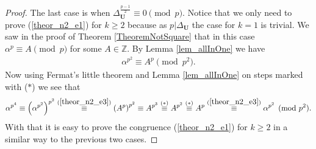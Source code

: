 \documentclass[preprint,12pt]{elsarticle}
\newcommand{\N}{\mathbb{N}}
\newcommand{\Z}{\mathbb{Z}}
\newcommand{\F}{\mathbb{F}}
\begin{document}
\begin{proof}
 The last case is when $\Delta_\mathbf{U}^\frac{p-1}{2} \equiv 0 \pmod p$. Notice that we only need to prove (\ref{theor_n2_e1}) for $k\geqslant 2$ because as $p|\Delta_\mathbf{U}$ the case for $k=1$ is trivial.  We saw in the proof of Theorem \ref{TheoremNotSquare} that in this case $\alpha^p \equiv A \pmod p$ for some $A \in \Z$. By Lemma \ref{lem_allInOne} we have
 \begin{align}\label{theor_n2_e3}
     \alpha^{p^2} \equiv A^p \pmod {p^2}.
 \end{align}
 Now using Fermat's little theorem and Lemma \ref{lem_allInOne} on steps marked with ($*$) we see that
 \begin{align}
     \alpha^{p^4} \equiv
     \left( \alpha^{p^2}\right)^{p^2} \overset{(\ref{theor_n2_e3})}{\equiv} 
     \left( A^p\right)^{p^2}
     \equiv A^{p^3}
    \overset{(*)}{\equiv} A^{p^2}
    \overset{(*)}{\equiv}A^p
       \overset{(\ref{theor_n2_e3})}{\equiv} \alpha^{p^2}
       \pmod{p^2}.
 \end{align}
 With that it is easy to prove the congruence (\ref{theor_n2_e1}) for $k\geqslant 2$ in a similar way to the previous two cases.





\end{proof}
\end{document}
